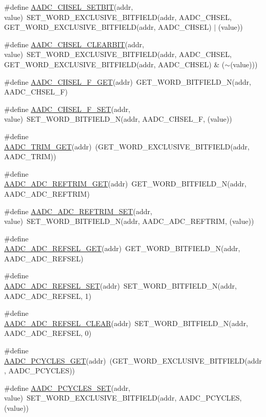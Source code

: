 \begin{DoxyCompactItemize}
\item 
\#define \hyperlink{a00542_a58828378154673b07ebb3fd296fd3aad}{AADC\_\-CHSEL\_\-SETBIT}(addr, value)~SET\_\-WORD\_\-EXCLUSIVE\_\-BITFIELD(addr, AADC\_\-CHSEL, GET\_\-WORD\_\-EXCLUSIVE\_\-BITFIELD(addr, AADC\_\-CHSEL) $|$ (value))
\item 
\#define \hyperlink{a00542_a1db07a438ae02ec9601c20e7741c3b9d}{AADC\_\-CHSEL\_\-CLEARBIT}(addr, value)~SET\_\-WORD\_\-EXCLUSIVE\_\-BITFIELD(addr, AADC\_\-CHSEL, GET\_\-WORD\_\-EXCLUSIVE\_\-BITFIELD(addr, AADC\_\-CHSEL) \& ($\sim$(value)))
\item 
\#define \hyperlink{a00542_a2609bd949276bd5b2d612c5497454f1a}{AADC\_\-CHSEL\_\-F\_\-GET}(addr)~GET\_\-WORD\_\-BITFIELD\_\-N(addr, AADC\_\-CHSEL\_\-F)
\item 
\#define \hyperlink{a00542_a0b20797e62882010939d374e8b0529a4}{AADC\_\-CHSEL\_\-F\_\-SET}(addr, value)~SET\_\-WORD\_\-BITFIELD\_\-N(addr, AADC\_\-CHSEL\_\-F, (value))
\item 
\#define \hyperlink{a00542_a9d333a909986b44703ee24722886cbba}{AADC\_\-TRIM\_\-GET}(addr)~(GET\_\-WORD\_\-EXCLUSIVE\_\-BITFIELD(addr, AADC\_\-TRIM))
\item 
\#define \hyperlink{a00542_a31860cb802baa584fc31e4bbe9a09d75}{AADC\_\-ADC\_\-REFTRIM\_\-GET}(addr)~GET\_\-WORD\_\-BITFIELD\_\-N(addr, AADC\_\-ADC\_\-REFTRIM)
\item 
\#define \hyperlink{a00542_aef07ae0ab63e41c8960735e27ead7f96}{AADC\_\-ADC\_\-REFTRIM\_\-SET}(addr, value)~SET\_\-WORD\_\-BITFIELD\_\-N(addr, AADC\_\-ADC\_\-REFTRIM, (value))
\item 
\#define \hyperlink{a00542_abc7b07af00d9f846b5beb9b661d34d18}{AADC\_\-ADC\_\-REFSEL\_\-GET}(addr)~GET\_\-WORD\_\-BITFIELD\_\-N(addr, AADC\_\-ADC\_\-REFSEL)
\item 
\#define \hyperlink{a00542_a1cb291e094202bd913e9bf7f81358625}{AADC\_\-ADC\_\-REFSEL\_\-SET}(addr)~SET\_\-WORD\_\-BITFIELD\_\-N(addr, AADC\_\-ADC\_\-REFSEL, 1)
\item 
\#define \hyperlink{a00542_ac2a7501d237098b41e03767da65c8e6f}{AADC\_\-ADC\_\-REFSEL\_\-CLEAR}(addr)~SET\_\-WORD\_\-BITFIELD\_\-N(addr, AADC\_\-ADC\_\-REFSEL, 0)
\item 
\#define \hyperlink{a00542_a4ae2076563013b371aaba878cee3ce39}{AADC\_\-PCYCLES\_\-GET}(addr)~(GET\_\-WORD\_\-EXCLUSIVE\_\-BITFIELD(addr, AADC\_\-PCYCLES))
\item 
\#define \hyperlink{a00542_a2f14028f5091eebdb13419372538cf07}{AADC\_\-PCYCLES\_\-SET}(addr, value)~SET\_\-WORD\_\-EXCLUSIVE\_\-BITFIELD(addr, AADC\_\-PCYCLES, (value))

\end{DoxyCompactItemize}
